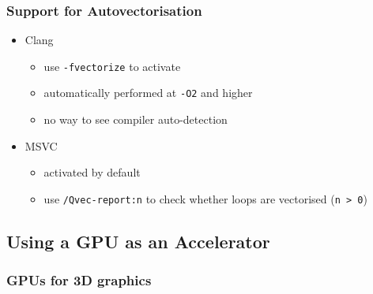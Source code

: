 \subsubsection{Support for
Autovectorisation}\label{support-for-autovectorisation-1}

\begin{itemize}
\itemsep1pt\parskip0pt
\item
  Clang

  \begin{itemize}
  \itemsep1pt\parskip0pt
  \item
    use \texttt{-fvectorize} to activate
  \item
    automatically performed at \texttt{-O2} and higher
  \item
    no way to see compiler auto-detection
  \end{itemize}
\item
  MSVC

  \begin{itemize}
  \itemsep1pt\parskip0pt
  \item
    activated by default
  \item
    use \texttt{/Qvec-report:n} to check whether loops are vectorised
    (\texttt{n \textgreater{} 0})
  \end{itemize}
\end{itemize}

\subsection{Using a GPU as an
Accelerator}\label{using-a-gpu-as-an-accelerator}

\subsubsection{GPUs for 3D graphics}\label{gpus-for-3d-graphics}

